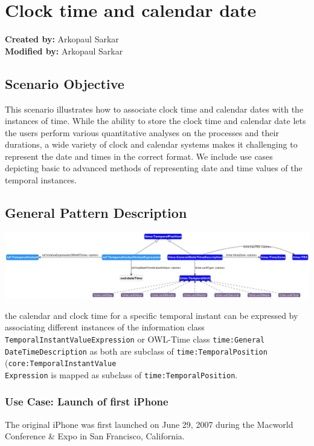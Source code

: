 \section{Clock time and calendar date}
\label{sec-change-location}

\textbf{Created by:} Arkopaul Sarkar \\
\textbf{Modified by:} Arkopaul Sarkar \\

\subsection*{Scenario Objective}

This scenario illustrates how to associate clock time and calendar dates with the instances of time. While the ability to store the clock time and calendar date lets the users perform various quantitative analyses on the processes and their durations, a wide variety of clock and calendar systems makes it challenging to represent the date and times in the correct format. We include use cases depicting basic to advanced methods of representing date and time values of the temporal instances.


\subsection*{General Pattern Description}

\includegraphics[scale=0.28]{scenarios/clock-time-calendar-date/images/general-clock-calendar.png}

the calendar and clock time for a specific temporal instant can be expressed by associating different instances of the information class \texttt{TemporalInstantValueExpression} or OWL-Time class \texttt{time:General\\DateTimeDescription} as both are subclass of \texttt{time:TemporalPosition} (\texttt{core:TemporalInstantValue\\Expression} is mapped as subclass of \texttt{time:TemporalPosition}.  

\subsubsection*{Use Case: Launch of first iPhone} 
The original iPhone was first launched on June 29, 2007 during the Macworld Conference \& Expo in San Francisco, California. 


